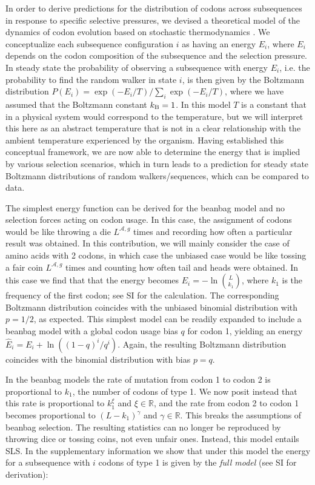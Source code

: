 \documentclass[a4paper,10pt]{paper}%
\newcommand*{\bc}{k_{\textup{B}}}
\begin{document}
\par
In order to derive  predictions for the distribution of codons across subsequences in response to specific selective pressures, we devised a theoretical model of the dynamics of codon evolution based on stochastic thermodynamics \cite{seifertreview}.  We  conceptualize each subsequence configuration $i$ as having an energy $E_i$, where $E_i$ depends on the codon composition of the subsequence and the selection pressure. In  steady state  the probability of  observing a subsequence with energy $E_i$, i.e. the probability to find the random walker in state $i$,  is then  given by the Boltzmann distribution $P(E_i) = \exp(-E_i/T)/\sum_i \exp(-E_i/T)$, where we have assumed that the Boltzmann constant  $\bc=1$.  In this model  $T$ is a constant that in a physical system would correspond to the temperature, but we will interpret this here as an abstract temperature that is not in a clear relationship with the ambient temperature experienced by the organism. Having established this conceptual framework, we are now able to determine the energy that is implied by various selection scenarios, which in turn  leads to a prediction for  steady state Boltzmann distributions of random walkers/sequences, which can be compared to data.
\par
The  simplest energy function can be derived for the beanbag model and   no  selection forces acting on codon usage. In this case, the assignment of codons would be like throwing a die $L^{\mathcal A,g}$ times and recording how often a particular result was obtained. In this contribution, we will   mainly  consider the case of amino acids with 2 codons, in which case the  unbiased case would be like tossing a fair coin $L^{\mathcal A,g}$ times and counting how often tail and heads were obtained.  In this  case we find that  that the energy becomes  $E_i=-\ln {L\choose k_1}$, where $k_1$ is the frequency of the first codon; see SI for the calculation. The corresponding Boltzmann distribution coincides with the unbiased binomial distribution with $p=1/2$, as expected. This simplest model can be readily expanded to include  a beanbag model with  a global codon usage bias $q$ for codon 1, yielding an energy  $\hat E_i = E_i  + \ln\left( (1-q)^i / q^i \right)$. Again, the resulting Boltzmann distribution  coincides with the  binomial distribution with bias $p=q$.    
\par
In the beanbag models the rate of mutation from codon 1 to codon 2 is proportional to $k_1$, the number of codons of type 1.  We now posit instead that this rate is   proportional to $k_1^\xi$ and $\xi\in\mathbb R$, and  the rate from codon 2 to codon 1 becomes  proportional to $(L-k_1)^\gamma$ and $\gamma\in\mathbb R$. This breaks the assumptions of  beanbag selection.  The resulting statistics can no longer be reproduced by throwing dice or tossing coins, not even unfair ones. Instead, this  model  entails SLS.  In the supplementary information we show that  under this model the  energy  for a subsequence with $i$ codons of type 1  is given by the {\em full model}  (see SI for derivation): 
\end{document}
